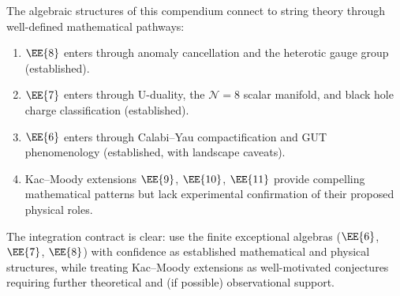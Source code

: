 The algebraic structures of this compendium connect to string theory through
well-defined mathematical pathways:
\begin{enumerate}
    \item $\EE{8}$ enters through anomaly cancellation and the heterotic
          gauge group (established).
    \item $\EE{7}$ enters through U-duality, the $\mathcal{N}=8$ scalar
          manifold, and black hole charge classification (established).
    \item $\EE{6}$ enters through Calabi--Yau compactification and GUT
          phenomenology (established, with landscape caveats).
    \item Kac--Moody extensions $\EE{9}$, $\EE{10}$, $\EE{11}$ provide
          compelling mathematical patterns but lack experimental
          confirmation of their proposed physical roles.
\end{enumerate}

The integration contract is clear: use the finite exceptional algebras
($\EE{6}$, $\EE{7}$, $\EE{8}$) with confidence as established mathematical
and physical structures, while treating Kac--Moody extensions as
well-motivated conjectures requiring further theoretical and (if possible)
observational support.
